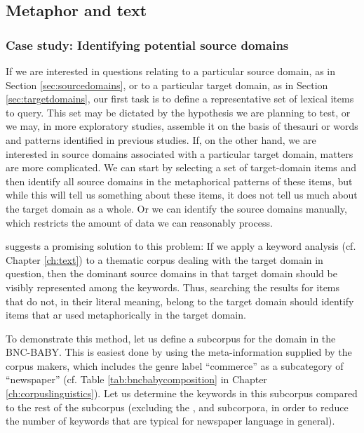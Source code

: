 \subsection{Metaphor and text}
\label{sec:metaphorandtext}

\subsubsection{Case study: Identifying potential source domains}
\label{sec:identifyingpotentialsourcedomains}

If we are interested in questions relating to a particular source domain, as in Section \ref{sec:sourcedomains}, or to a particular target domain, as in Section \ref{sec:targetdomains}, our first task is to define a representative set of lexical items to query. This set may be dictated by the hypothesis we are planning to test, or we may, in more exploratory studies, assemble it on the basis of thesauri or words and patterns identified in previous studies. If, on the other hand, we are interested in source domains associated with a particular target domain, matters are more complicated. We can start by selecting a set of target-domain items and then identify all source domains in the metaphorical patterns of these items, but while this will tell us something about these items, it does not tell us much about the target domain as a whole. Or we can identify the source domains manually, which restricts the amount of data we can reasonably process.

\citet{partington_patterns_1998} suggests a promising solution to this problem: If we apply a keyword analysis (cf. Chapter \ref{ch:text}) to a thematic corpus dealing with the target domain in question, then the dominant source domains in that target domain should be visibly represented among the keywords. Thus, searching the results for items that do not, in their literal meaning, belong to the target domain should identify items that ar used metaphorically in the target domain.

To demonstrate this method, let us define a subcorpus for the domain  in the BNC-BABY. This is easiest done by using the meta-information supplied by the corpus makers, which includes the genre label ``commerce'' as a subcategory of ``newspaper'' (cf. Table \ref{tab:bncbabycomposition} in Chapter \ref{ch:corpuslinguistics}). Let us determine the keywords in this subcorpus compared to the rest of the  subcorpus (excluding the ,  and  subcorpora, in order to reduce the number of keywords that are typical for newspaper language in general).


